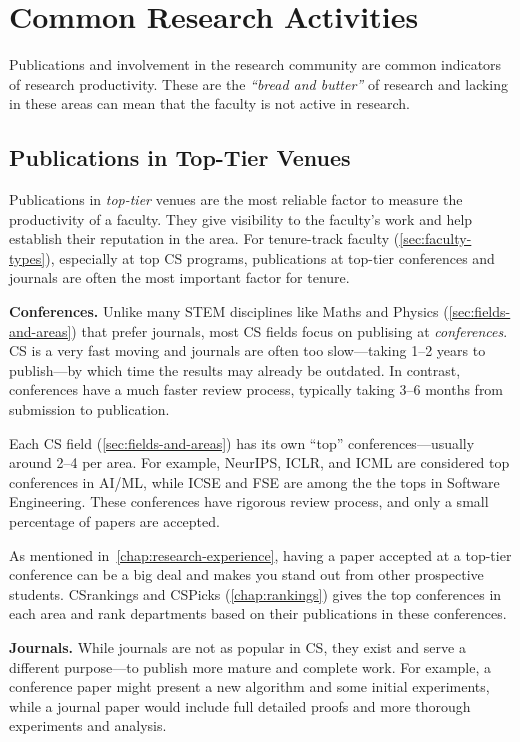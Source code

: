 \documentclass[oneside,11pt]{book}
\begin{document}
\section{Common Research Activities}\label{sec:common-research-indicators}

Publications and involvement in the research community are common indicators of research productivity. These are the \emph{``bread and butter''} of research and lacking in these areas can mean that the faculty is not active in research.

\subsection{Publications in Top-Tier Venues}\label{sec:pubs-top-tier}

Publications in \emph{top-tier} venues are the most reliable factor to measure the productivity of a faculty. They give visibility to the faculty's work and help establish their reputation in the area. For tenure-track faculty (\autoref{sec:faculty-types}), especially at top CS programs, publications at top-tier conferences and journals are often the most important factor for tenure.

\textbf{Conferences.} Unlike many STEM disciplines like Maths and Physics (\autoref{sec:fields-and-areas}) that prefer journals, most CS fields  focus on publising at \emph{conferences}. CS is a very fast moving and journals are often too slow---taking 1--2 years to publish---by which time the results may already be outdated.  In contrast, conferences have a much faster review process, typically taking 3--6 months from submission to publication.

Each CS field (\autoref{sec:fields-and-areas}) has its own ``top'' conferences---usually around 2--4 per area. For example, NeurIPS, ICLR, and ICML are considered top conferences in AI/ML, while ICSE and FSE are among the the tops in Software Engineering.
These conferences have rigorous review process, and only a small percentage of papers are accepted. 

As mentioned in~\autoref{chap:research-experience}, having a paper accepted at a top-tier conference can be a big deal and makes you stand out from other prospective students. 
CSrankings and CSPicks (\autoref{chap:rankings}) gives the top conferences in each area and rank departments based on their publications in these conferences.


\textbf{Journals.} While journals are not as popular in CS, they exist and serve a different purpose---to publish more mature and complete work.
For example, a conference paper might present a new algorithm and some initial experiments, while a journal paper would include full detailed proofs and more thorough experiments and analysis. 
\end{document}
